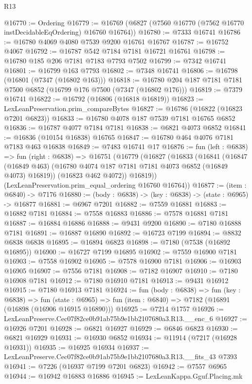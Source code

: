 \begin{lexlean}{R13}
\begin{coremodule}
@16770 := Ordering
@16779 := @16769 (@6827 (@7560 @16770 (@7562 @16770 instDecidableEqOrdering) @16760 @16764))
@16780 := @7333 @16741
@16786 := @16780 @4069 @4080 @7539 @9200 @16761 @16767
@16787 := @16752 @4067
@16792 := @16787 @542 @7184 @7181 @16721 @16761
@16798 := @16780 @185 @206 @7181 @7183 @7793 @7502
@16799 := @7342 @16741
@16801 := @16799 @163 @7793
@16802 := @7348 @16741
@16806 := @16798 (@16801 (@7347 (@16802 @163)))
@16818 := @16780 @204 @187 @7181 @7181 @7500 @6852 (@16799 @176 @7500 (@7347 (@16802 @176)))
@16819 := @7379 @16741
@16822 := @16792 (@16806 (@16818 @16819))
@16823 := LexLeanPreservation.prim_compareBytes
@16827 := @16786 (@16822 (@16823 @7201 @6823))
@16833 := @16780 @4078 @187 @7539 @7181 @16765 @6852
@16836 := @16787 @4077 @7184 @7181
@16838 := @6821 @4073 @6852
@16841 := @16836 (@10154 @16838) @16765
@16847 := @16780 @464 @4076 @7181 @7183 @463 @16838
@16849 := @7483 @16741 @17
@16876 := fun (left : @6838) =>
  fun (right : @6838) =>
  @16751
    (@16779
      (@16827
        (@16833
          (@16841
            (@16847 (@16849 @463) (@16780 @4074 @187 @7181 @7181 @4073 @6852 (@16849 @4073) @16819))
            (@16823 @462 @4072))
          @16819))
      (LexLeanPreservation.prim_equal_ordering @16760 @16764))
@16877 := (item : @6840) -> @7176
@16880 := (body : @6838) -> (key : @6838) -> (state : @6965) -> @16877
@16881 := @6967 @7201
@16882 := @7559 @16881
@16883 := @16882 @7181
@16884 := @7558 @16883
@16886 := @7578 @16881 @7181
@16887 := @16884 @16886
@16888 := @9431 @9200
@16890 := @7180 @16888 @7181
@16891 := @16887 @16890
@16892 := @16723 @7199
@16894 := @8832 @6838 @6838
@16895 := @16894 @6823
@16898 := @7180 (@7538 (@16892 @16895))
@16900 := @16727 @7199 @16895
@16902 := @7559 @16900 @7181
@16903 := @7558 @16902
@16905 := @7578 @16900 @7181
@16906 := @16903 @16905
@16907 := @7556 @7181
@16908 := @7182 @16907
@16910 := @7180 @16908 @7181
@16912 := @7180 @16910 @7181
@16913 := @9431 @16912
@16915 := @7180 @16913 @7181
@16924 := fun (body : @6838) =>
  fun (key : @6838) =>
  fun (state : @6965) => fun (item : @6840) => @7182 (@16891 (@16898 (@16906 @16915 @16890)))
@16925 := @7214 @1757
@16926 := LexLeanPreserve.Cec07f82ce0b91ab75b9e1bb2107680a3.R13.__enc_6
@16927 := @16926 @7201
@16928 := @6821 @16927
@16929 := @6846 @6823
@16930 := @6821 @16929
@16931 := @16930 @6852
@16934 := @11914 (@7217 (@16928 @16931))
@16935 := @16925 @16934
@16937 := LexLeanPreserve.Cec07f82ce0b91ab75b9e1bb2107680a3.R13.__fits_43 @7393
@16941 := @7226 (@16937 @7199 @7201 @6823)
@16942 := @7557 @6965
@16944 := @16942 @16883 @16886
@16945 := LexLeanKappa.Gguf.Placing.mk

\end{coremodule}
\end{lexlean}
